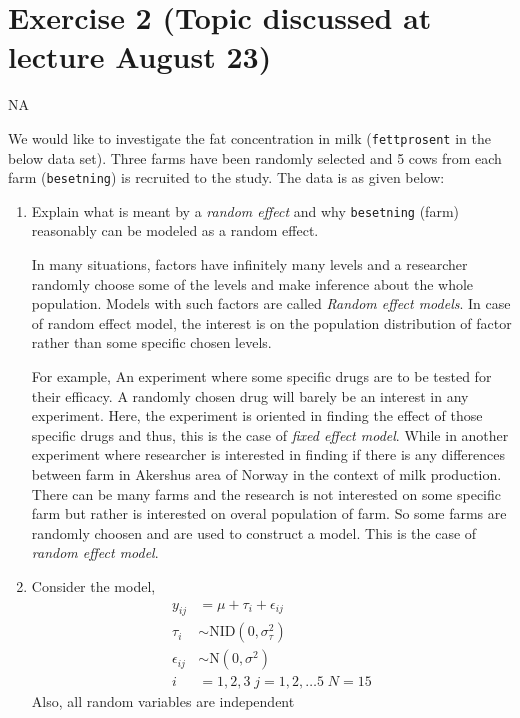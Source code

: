 \documentclass[11pt,a4paper]{article}
\begin{document}
\section{Exercise 2 (Topic discussed at lecture August
23)}\label{exercise-2-topic-discussed-at-lecture-august-23}

NA

We would like to investigate the fat concentration in milk
(\texttt{fettprosent} in the below data set). Three farms have been
randomly selected and 5 cows from each farm (\texttt{besetning}) is
recruited to the study. The data is as given below:

\begin{enumerate}
\def\labelenumi{\alph{enumi})}
\item
  Explain what is meant by a \emph{random effect} and why
  \texttt{besetning} (farm) reasonably can be modeled as a random
  effect.

  In many situations, factors have infinitely many levels and a
  researcher randomly choose some of the levels and make inference about
  the whole population. Models with such factors are called \emph{Random
  effect models}. In case of random effect model, the interest is on the
  population distribution of factor rather than some specific chosen
  levels.

  For example, An experiment where some specific drugs are to be tested
  for their efficacy. A randomly chosen drug will barely be an interest
  in any experiment. Here, the experiment is oriented in finding the
  effect of those specific drugs and thus, this is the case of
  \emph{fixed effect model}. While in another experiment where
  researcher is interested in finding if there is any differences
  between farm in Akershus area of Norway in the context of milk
  production. There can be many farms and the research is not interested
  on some specific farm but rather is interested on overal population of
  farm. So some farms are randomly choosen and are used to construct a
  model. This is the case of \emph{random effect model}.
\item
  Consider the model, \[
  \begin{aligned}
  y_{ij} &= \mu + \tau_i + \epsilon_{ij} \\
  \tau_i &\sim \text{NID}\left(0, \sigma_\tau^2\right)\\
  \epsilon_{ij} &\sim \text{N}\left(0, \sigma^2\right) \\
  i &= 1, 2, 3\; j = 1, 2, \ldots 5\; N = 15
  \end{aligned}
  \] Also, all random variables are independent


\end{enumerate}
\end{document}
